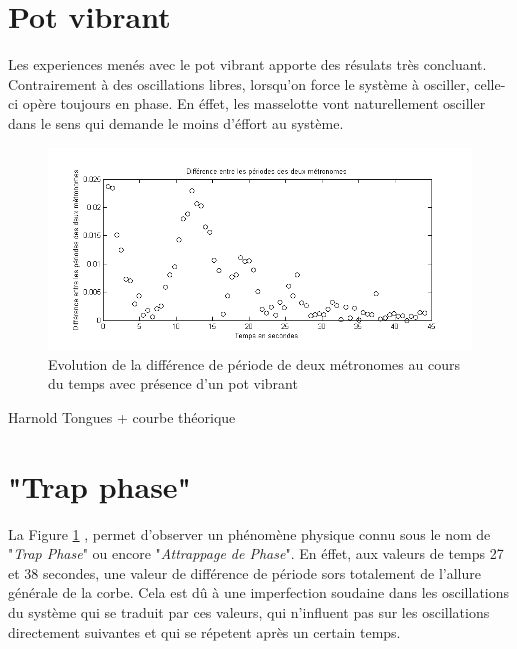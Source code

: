 \documentclass[a4paper,11pt]{report}
\begin{document}
\section{Pot vibrant}
Les experiences menés avec le pot vibrant apporte des résulats très concluant. Contrairement à des oscillations libres, lorsqu'on force le système à osciller, celle-ci opère toujours en phase. En éffet, les masselotte vont naturellement osciller dans le sens qui demande le moins d'éffort au système.
\begin{figure}[h]
\centering
\includegraphics[width=1\textwidth]{PotVibrant_Synchro_Periode_200BPM}
\caption{Evolution de la différence de période de deux métronomes au cours du temps avec présence d'un pot vibrant}
\label{SynchroPP}
\end{figure}
Harnold Tongues + courbe théorique

\section{"Trap phase"}
La Figure \ref{SynchroPP} , permet d'observer un phénomène physique connu sous le nom de "{\it Trap Phase}" ou encore "{\it Attrappage de Phase}". En éffet, aux valeurs de temps 27 et 38 secondes, une valeur de différence de période sors totalement de l'allure générale de la corbe. Cela est dû à une imperfection soudaine dans les oscillations du système qui se traduit par ces valeurs, qui n'influent pas sur les oscillations directement suivantes et qui se répetent après un certain temps.
\end{document}
